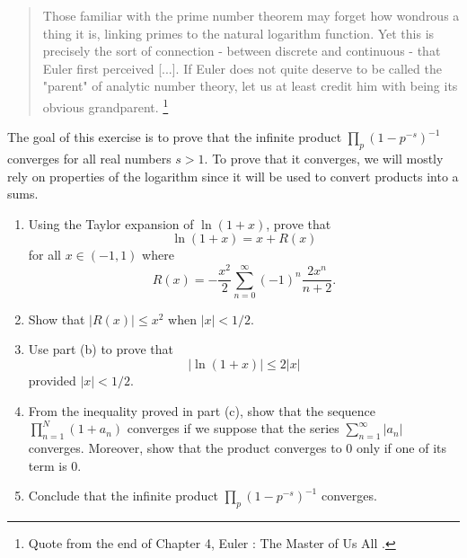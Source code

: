 \begin{quotation}
    Those familiar with the prime number theorem may forget how wondrous a thing it is, linking primes to the natural logarithm function. Yet this is precisely the sort of connection - between discrete and continuous - that Euler first perceived [...]. If Euler does not quite deserve to be called the "parent" of analytic number theory, let us at least credit him with being its obvious grandparent. \footnote{Quote from the end of Chapter 4, Euler : The Master of Us All \cite{dunham1999euler}. } \\
\end{quotation}


\begin{exercise} \label{Infinite Product convergence}
    The goal of this exercise is to prove that the infinite product $\prod_p (1 - p^{-s})^{-1}$ converges for all real numbers $s > 1$. To prove that it converges, we will mostly rely on properties of the logarithm since it will be used to convert products into a sums. 
    \begin{enumerate}[label=(\alph*)]
        \item Using the Taylor expansion of $\ln(1+x)$, prove that
        $$\ln(1+x) = x + R(x)$$
        for all $x \in (-1, 1)$ where
        $$R(x) = - \frac{x^2}{2}\sum_{n=0}^{\infty}(-1)^n \frac{2x^n}{n+2}.$$ 
        \item Show that $|R(x)| \leq x^2$ when $|x| < 1/2$.
        \item Use part (b) to prove that
        $$|\ln(1+x)| \leq 2|x|$$
        provided $|x| < 1/2$.  
        \item From the inequality proved in part (c), show that the sequence $\prod_{n=1}^{N}(1+a_n)$ converges if we suppose that the series $\sum_{n=1}^{\infty}|a_n|$ converges. Moreover, show that the product converges to 0 only if one of its term is 0.
        \item Conclude that the infinite product $\prod_p (1 - p^{-s})^{-1}$ converges.
    \end{enumerate}
\end{exercise}

